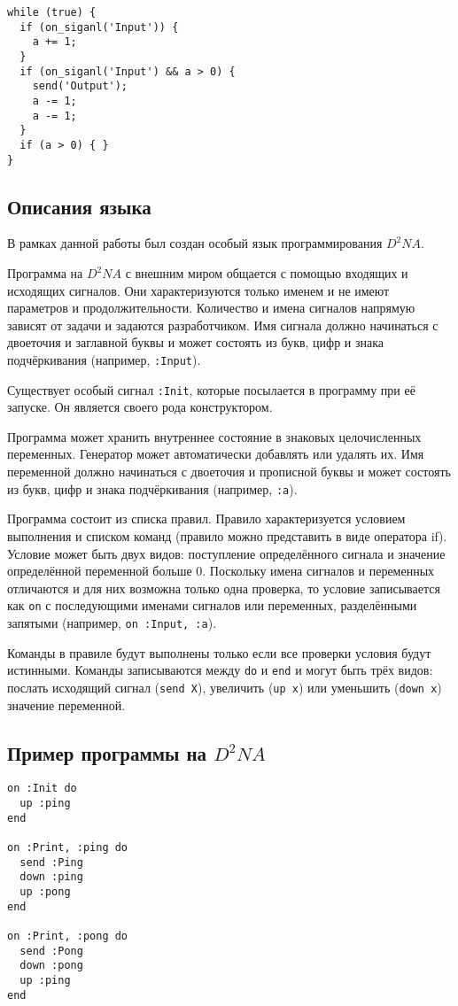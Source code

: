 \documentclass[utf8,a5paper,portrait,12pt]{eskdtext}
\begin{document}
\begin{verbatim}
while (true) {
  if (on_siganl('Input')) {
    a += 1;
  }
  if (on_siganl('Input') && a > 0) {
    send('Output');
    a -= 1;
    a -= 1;
  }
  if (a > 0) { }
}
\end{verbatim}

\subsection{Описания языка}

В рамках данной работы был создан особый язык программирования $D^2NA$.

Программа на $D^2NA$ с внешним миром общается с помощью входящих и исходящих
сигналов. Они характеризуются только именем и не имеют параметров и
продолжительности. Количество и имена сигналов напрямую зависят от задачи и
задаются разработчиком. Имя сигнала должно начинаться с двоеточия и заглавной
буквы и может состоять из букв, цифр и знака подчёркивания (например,
\texttt{:Input}).

Существует особый сигнал \texttt{:Init}, которые посылается в программу при её
запуске. Он является своего рода конструктором.

Программа может хранить внутреннее состояние в знаковых целочисленных
переменных. Генератор может автоматически добавлять или удалять их. Имя
переменной должно начинаться с двоеточия и прописной буквы и может состоять из
букв, цифр и знака подчёркивания (например, \texttt{:a}).

Программа состоит из списка правил. Правило характеризуется условием выполнения
и списком команд (правило можно представить в виде оператора if). Условие может
быть двух видов: поступление определённого сигнала и значение определённой
переменной больше 0. Поскольку имена сигналов и переменных отличаются и для
них возможна только одна проверка, то условие записывается как \texttt{on} с
последующими именами сигналов или переменных, разделёнными запятыми (например,
\texttt{on~:Input, :a}).

Команды в правиле будут выполнены только если все проверки условия будут
истинными. Команды записываются между \texttt{do} и \texttt{end} и могут быть
трёх видов: послать исходящий сигнал (\texttt{send X}), увеличить
(\texttt{up x}) или уменьшить (\texttt{down x}) значение переменной.

\subsection{Пример программы на $D^2NA$}
\begin{verbatim}
on :Init do
  up :ping
end

on :Print, :ping do
  send :Ping
  down :ping
  up :pong
end

on :Print, :pong do
  send :Pong
  down :pong
  up :ping
end
\end{verbatim}
\end{document}
